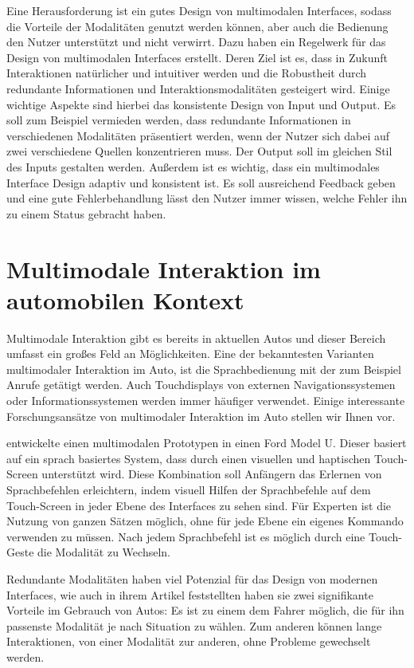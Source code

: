 Eine Herausforderung ist ein gutes Design von multimodalen Interfaces, sodass die Vorteile der Modalitäten genutzt werden können, aber auch die Bedienung den Nutzer unterstützt und nicht verwirrt. 
Dazu haben \citet{Reeves_2004} ein Regelwerk für das Design von multimodalen Interfaces erstellt. 
Deren Ziel ist es, dass in Zukunft Interaktionen natürlicher und intuitiver werden und die Robustheit durch redundante Informationen und Interaktionsmodalitäten gesteigert wird. 
Einige wichtige Aspekte sind hierbei das konsistente Design von Input und Output. 
Es soll zum Beispiel vermieden werden, dass redundante Informationen in verschiedenen Modalitäten präsentiert werden, wenn der Nutzer sich dabei auf zwei verschiedene Quellen konzentrieren muss. 
Der Output soll im gleichen Stil des Inputs gestalten werden. 
Außerdem ist es wichtig, dass ein multimodales Interface Design adaptiv und konsistent ist. 
Es soll ausreichend Feedback geben und eine gute Fehlerbehandlung lässt den Nutzer immer wissen, welche Fehler ihn zu einem Status gebracht haben. 

\section[Multimodale Interaktion im Auto]{Multimodale Interaktion im automobilen Kontext}
Multimodale Interaktion gibt es bereits in aktuellen Autos und dieser Bereich umfasst ein großes Feld an Möglichkeiten. 
Eine der bekanntesten Varianten multimodaler Interaktion im Auto, ist die Sprachbedienung mit der zum Beispiel Anrufe getätigt werden. 
Auch Touchdisplays von externen Navigationssystemen oder Informationssystemen werden immer häufiger verwendet. 
Einige interessante Forschungsansätze von multimodaler Interaktion im Auto stellen wir Ihnen vor.

\citet{Pieraccini_2004} entwickelte einen multimodalen Prototypen in einen Ford Model U. Dieser basiert auf ein sprach basiertes System, dass durch einen visuellen und haptischen Touch-Screen unterstützt wird. 
Diese Kombination soll Anfängern das Erlernen von Sprachbefehlen erleichtern, indem visuell Hilfen der Sprachbefehle auf dem Touch-Screen in jeder Ebene des Interfaces zu sehen sind. 
Für Experten ist die Nutzung von ganzen Sätzen möglich, ohne für jede Ebene ein eigenes Kommando verwenden zu müssen.
Nach jedem Sprachbefehl ist es möglich durch eine Touch-Geste die Modalität zu Wechseln. 

Redundante Modalitäten haben viel Potenzial für das Design von modernen Interfaces, wie auch \citet{Muller_2011} in ihrem Artikel feststellten haben sie zwei signifikante Vorteile im Gebrauch von Autos: Es ist zu einem dem Fahrer möglich, die für ihn passenste Modalität je nach Situation zu wählen. 
Zum anderen können lange Interaktionen, von einer Modalität zur anderen, ohne Probleme gewechselt werden.

